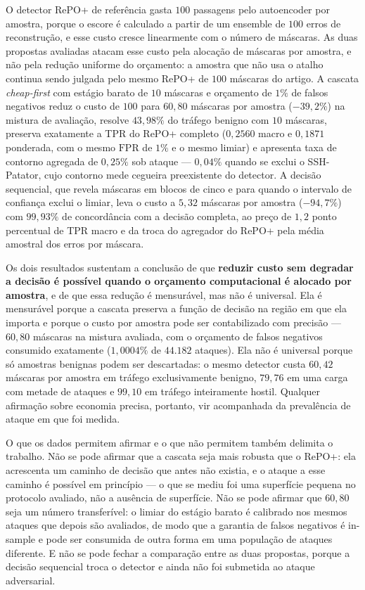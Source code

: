 \documentclass[conference]{IEEEtran}
\begin{document}
O detector RePO+ de referência gasta $100$ passagens pelo autoencoder por amostra, porque o escore é calculado a partir de um ensemble de $100$ erros de reconstrução, e esse custo cresce linearmente com o número de máscaras.
As duas propostas avaliadas atacam esse custo pela alocação de máscaras por amostra, e não pela redução uniforme do orçamento: a amostra que não usa o atalho continua sendo julgada pelo mesmo RePO+ de $100$ máscaras do artigo.
A cascata \textit{cheap-first} com estágio barato de $10$ máscaras e orçamento de $1\%$ de falsos negativos reduz o custo de $100$ para $60{,}80$ máscaras por amostra ($-39{,}2\%$) na mistura de avaliação, resolve $43{,}98\%$ do tráfego benigno com $10$ máscaras, preserva exatamente a TPR do RePO+ completo ($0{,}2560$ macro e $0{,}1871$ ponderada, com o mesmo $\text{FPR}$ de $1\%$ e o mesmo limiar) e apresenta taxa de contorno agregada de $0{,}25\%$ sob ataque — $0{,}04\%$ quando se exclui o SSH-Patator, cujo contorno mede cegueira preexistente do detector.
A decisão sequencial, que revela máscaras em blocos de cinco e para quando o intervalo de confiança exclui o limiar, leva o custo a $5{,}32$ máscaras por amostra ($-94{,}7\%$) com $99{,}93\%$ de concordância com a decisão completa, ao preço de $1{,}2$ ponto percentual de TPR macro e da troca do agregador do RePO+ pela média amostral dos erros por máscara.

Os dois resultados sustentam a conclusão de que \textbf{reduzir custo sem degradar a decisão é possível quando o orçamento computacional é alocado por amostra}, e de que essa redução é mensurável, mas não é universal.
Ela é mensurável porque a cascata preserva a função de decisão na região em que ela importa e porque o custo por amostra pode ser contabilizado com precisão — $60{,}80$ máscaras na mistura avaliada, com o orçamento de falsos negativos consumido exatamente ($1{,}0004\%$ de $44.182$ ataques).
Ela não é universal porque só amostras benignas podem ser descartadas: o mesmo detector custa $60{,}42$ máscaras por amostra em tráfego exclusivamente benigno, $79{,}76$ em uma carga com metade de ataques e $99{,}10$ em tráfego inteiramente hostil.
Qualquer afirmação sobre economia precisa, portanto, vir acompanhada da prevalência de ataque em que foi medida.

O que os dados permitem afirmar e o que não permitem também delimita o trabalho.
Não se pode afirmar que a cascata seja mais robusta que o RePO+: ela acrescenta um caminho de decisão que antes não existia, e o ataque a esse caminho é possível em princípio — o que se mediu foi uma superfície pequena no protocolo avaliado, não a ausência de superfície.
Não se pode afirmar que $60{,}80$ seja um número transferível: o limiar do estágio barato é calibrado nos mesmos ataques que depois são avaliados, de modo que a garantia de falsos negativos é in-sample e pode ser consumida de outra forma em uma população de ataques diferente.
E não se pode fechar a comparação entre as duas propostas, porque a decisão sequencial troca o detector e ainda não foi submetida ao ataque adversarial.
\end{document}
